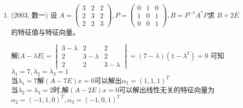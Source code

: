 \documentclass[12pt, a4paper, oneside, UTF8]{ctexbook}
\begin{document}
\begin{enumerate}
    \item (2003, 数一) 设
    $A = \begin{pmatrix}
    3 & 2 & 2 \\
    2 & 3 & 2 \\
    2 & 2 & 3
    \end{pmatrix},P=\begin{pmatrix}
        0 & 1 & 0 \\
        1 & 0 & 1 \\
        0 & 0 & 1 
    \end{pmatrix},B = P^{-1} A^* P$求 $B + 2E$ 的特征值与特征向量。
    
    \begin{solution}[特征方程法]
    解$\left|A-\lambda E\right|=\begin{vmatrix}
        3-\lambda & 2 & 2\\
        2 & 3-\lambda & 2 \\
        2 & 2 & 3-\lambda
    \end{vmatrix}=(7-\lambda)(1-\lambda^2)=0$ 可知$\lambda_1=7,\lambda_2=\lambda_3=1$ \\
    当$\lambda_1=7$解$(A-7E)x=0$可以解出$\alpha_1=(1,1,1)^T$ \\
    当$\lambda_2=\lambda_3=2$时,解$(A-2E)x=0$可以解出线性无关的特征向量为$\alpha_2=(-1,1,0)^T,\alpha_3=(-1,0,1)^T$
    \end{solution}
    

\end{enumerate}
\end{document}
